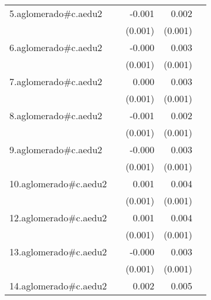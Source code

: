 {\begin{longtable}{l*{4}{D{.}{.}{-1}}}
\addlinespace
5.aglomerado#c.aedu2&                     &      -0.001         &       0.002\sym{**} &                     \\
            &                     &     (0.001)         &     (0.001)         &                     \\
\addlinespace
6.aglomerado#c.aedu2&                     &      -0.000         &       0.003\sym{***}&                     \\
            &                     &     (0.001)         &     (0.001)         &                     \\
\addlinespace
7.aglomerado#c.aedu2&                     &       0.000         &       0.003\sym{***}&                     \\
            &                     &     (0.001)         &     (0.001)         &                     \\
\addlinespace
8.aglomerado#c.aedu2&                     &      -0.001         &       0.002         &                     \\
            &                     &     (0.001)         &     (0.001)         &                     \\
\addlinespace
9.aglomerado#c.aedu2&                     &      -0.000         &       0.003\sym{**} &                     \\
            &                     &     (0.001)         &     (0.001)         &                     \\
\addlinespace
10.aglomerado#c.aedu2&                     &       0.001         &       0.004\sym{***}&                     \\
            &                     &     (0.001)         &     (0.001)         &                     \\
\addlinespace
12.aglomerado#c.aedu2&                     &       0.001         &       0.004\sym{***}&                     \\
            &                     &     (0.001)         &     (0.001)         &                     \\
\addlinespace
13.aglomerado#c.aedu2&                     &      -0.000         &       0.003\sym{***}&                     \\
            &                     &     (0.001)         &     (0.001)         &                     \\
\addlinespace
14.aglomerado#c.aedu2&                     &       0.002         &       0.005\sym{***}&                     \\

\end{longtable}}
